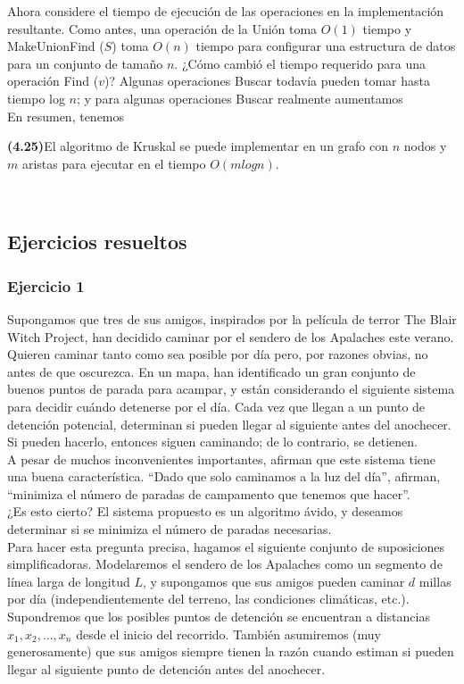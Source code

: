 \documentclass[a4paper, 12pt]{book}
\theoremstyle{dotless}
\begin{document}
Ahora considere el tiempo de ejecución de las operaciones en la implementación resultante. Como antes, una operación de la Unión toma $O(1)$ tiempo y MakeUnionFind ($S$) toma $O(n)$ tiempo para configurar una estructura de datos para un conjunto de tamaño $n$. ¿Cómo cambió el tiempo requerido para una operación Find ($v$)? Algunas operaciones Buscar todavía pueden tomar hasta tiempo log $n$; y para algunas operaciones Buscar realmente aumentamos\\

En resumen, tenemos\\


\colorbox{mygray}{\parbox{15cm}{
\textbf{(4.25)}El algoritmo de Kruskal se puede implementar en un grafo con $n$ nodos y $m$ aristas para ejecutar en el tiempo $O(mlogn)$.}}\\

\subsection{Ejercicios resueltos}

\subsubsection{Ejercicio 1}

Supongamos que tres de sus amigos, inspirados por la película de terror The Blair Witch Project, han decidido caminar por el sendero de los Apalaches este verano. Quieren caminar tanto como sea posible por día pero, por razones obvias, no antes de que oscurezca. En un mapa, han identificado un gran conjunto de buenos puntos de parada para acampar, y están considerando el siguiente sistema para decidir cuándo detenerse por el día. Cada vez que llegan a un punto de detención potencial, determinan si pueden llegar al siguiente antes del anochecer. Si pueden hacerlo, entonces siguen caminando; de lo contrario, se detienen.\\


A pesar de muchos inconvenientes importantes, afirman que este sistema tiene una buena característica. ``Dado que solo caminamos a la luz del día'', afirman, ``minimiza el número de paradas de campamento que tenemos que hacer''.\\

¿Es esto cierto? El sistema propuesto es un algoritmo ávido, y deseamos determinar si se minimiza el número de paradas necesarias.\\

Para hacer esta pregunta precisa, hagamos el siguiente conjunto de suposiciones simplificadoras. Modelaremos el sendero de los Apalaches como un segmento de línea larga de longitud $L$, y supongamos que sus amigos pueden caminar $d$ millas por día (independientemente del terreno, las condiciones climáticas, etc.). Supondremos que los posibles puntos de detención se encuentran a distancias $x_1, x_2, ..., x_n$ desde el inicio del recorrido. También asumiremos (muy generosamente) que sus amigos siempre tienen la razón cuando estiman si pueden llegar al siguiente punto de detención antes del anochecer.\\
\end{document}
